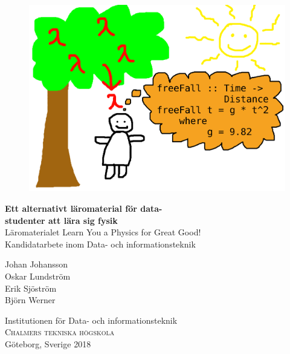 
\begin{titlepage}

\addtolength{\voffset}{2cm}

\begin{figure}[H]
\centering
\vspace{0cm}	%
\includegraphics[width=0.99\linewidth]{figure/Framsida.png}
\end{figure}

\renewcommand{\familydefault}{\sfdefault} \normalfont %
\vfill
\textbf{{\Huge  Ett alternativt läromaterial för data-\\studenter att lära sig fysik}} 	\\[0.5cm]
{\Large Läromaterialet Learn You a Physics for Great Good!}\\[0.5cm]
Kandidatarbete inom Data- och informationsteknik
\setlength{\parskip}{1cm}

{\Large Johan Johansson \\[0.3cm]
Oskar Lundström \\[0.3cm]
Erik Sjöström \\[0.2cm]
Björn Werner \\[0.2cm]}

Institutionen för Data- och informationsteknik \\
\textsc{Chalmers tekniska högskola} \\
Göteborg, Sverige 2018

\renewcommand{\familydefault}{\rmdefault} \normalfont %
\end{titlepage}


